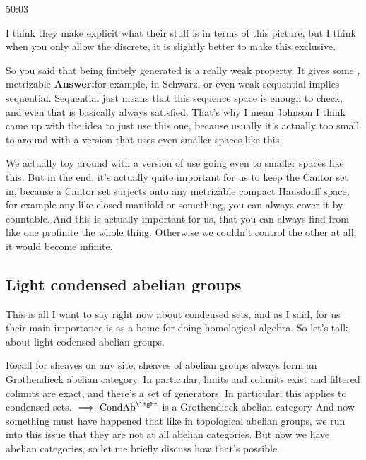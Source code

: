\begin{example}
\begin{unfinished}{50:03}
\begin{remark}
I think they make explicit what their stuff is in terms of this picture, but I think when you only allow the discrete, it is slightly better to make this exclusive.

So you said that being finitely generated is a really weak property. It gives some , 
metrizable
\textbf{Answer:}for example, in Schwarz, or even weak sequential implies sequential. Sequential just means that this sequence space is enough to check, and even that is basically always satisfied. That's why I mean Johnson I think came up with the idea to just use this one, because usually it's actually too small to around with a version that uses even smaller spaces like this.

We actually toy around with a version of use going even to smaller spaces like this. But in the end, it's actually quite important for us to keep the Cantor set in, because a Cantor set surjects onto any metrizable compact Hausdorff space, for example any like closed manifold or something, you can always cover it by countable. And this is actually important for us, that you can always find from like one profinite the whole thing. Otherwise we couldn't control the other at all, it would become infinite.

\subsection{Light condensed abelian groups} \label{subsec:light_condensed_abelian_groups}

This is all I want to say right now about condensed sets, and as I said, for us their main importance is as a home for doing homological algebra. So let's talk about light codensed abelian groups.

Recall for sheaves on any site, sheaves of abelian groups always form an Grothendieck abelian category. In particular, limits and colimits exist and filtered colimits are exact, and there's a set of generators. 
In particular, this applies to condensed sets.
$\implies \Cond\Ab^{\light}$ is a Grothendieck abelian category
And now something must have happened that like in topological abelian groups, we run into this issue that they are not at all abelian categories. But now we have abelian categories, so let me briefly discuss how that's possible.


\end{remark}
\end{unfinished}
\end{example}
